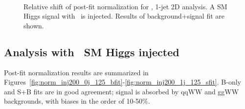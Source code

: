 \begin{figure}[!hbtp]
{}
\\
\caption{Relative shift of post-fit normalization for  \GeV, 1-jet 2D analysis.
A SM Higgs signal with  \GeV\ is injected. Results of background+signal fit are shown.}
\label{fig:norm_inj125_1j_125_sfit}
\end{figure}

\clearpage

\subsection{Analysis with  \GeV\ SM Higgs injected}

Post-fit normalization results are summarized in Figures~\ref{fig:norm_inj200_0j_125_bfit}-\ref{fig:norm_inj200_1j_125_sfit}.
B-only and S+B fits are in good agreement; signal is absorbed by qqWW and ggWW backgrounds, with biases in the order of 10-50\%.

